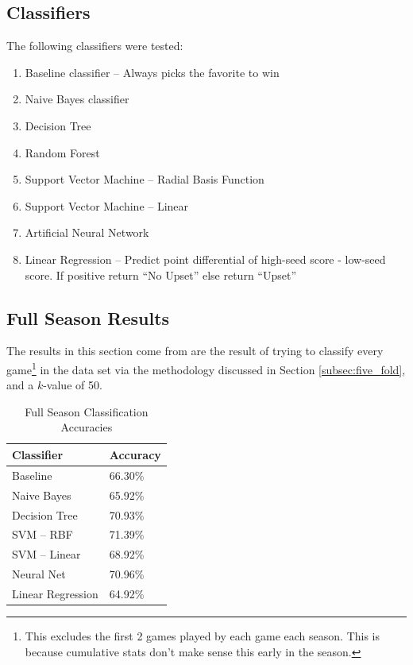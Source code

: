 \documentclass[]{article}
\begin{document}
\subsection{Classifiers}

The following classifiers were tested:
\begin{enumerate}
	\item Baseline classifier -- Always picks the favorite to win
	\item Naive Bayes classifier
	\item Decision Tree
	\item Random Forest
	\item Support Vector Machine -- Radial Basis Function
	\item Support Vector Machine -- Linear
	\item Artificial Neural Network
	\item Linear Regression -- Predict point differential of high-seed score - low-seed score. If positive return ``No Upset'' else return ``Upset''
\end{enumerate}

\subsection{Full Season Results}

The results in this section come from are the result of trying to classify every game\footnote{This excludes the first 2 games played by each game each season. This is because cumulative stats don't make sense this early in the season.} in the data set via the methodology discussed in Section \ref{subsec:five_fold}, and a $k$-value of 50.

\begin{table}[ht]
\centering
\begin{tabular}{@{}ll@{}}
\toprule
Classifier        & Accuracy \\ \midrule
Baseline          & 66.30\%  \\
Naive Bayes       & 65.92\%  \\
Decision Tree     & 70.93\%  \\
SVM -- RBF        & 71.39\%  \\
SVM -- Linear     & 68.92\%  \\
Neural Net        & 70.96\%  \\
Linear Regression & 64.92\%  \\ \bottomrule
\end{tabular}
\caption{Full Season Classification Accuracies}
\label{table:full_season_classification}
\end{table}
\end{document}
